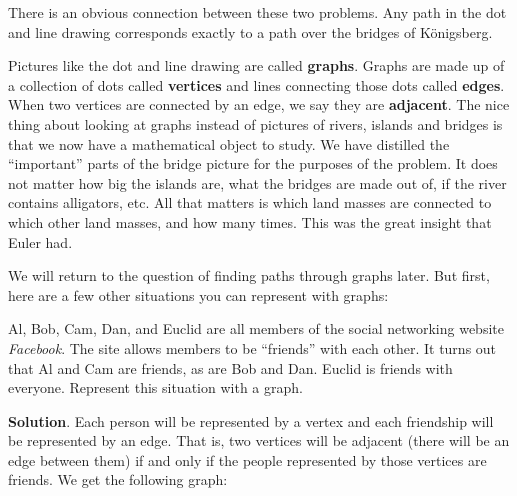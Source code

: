 \documentclass[11pt,]{book}
\newcommand{\terminology}[1]{\textbf{#1}}
\theoremstyle{ptxplainnotitle}
\theoremstyle{ptxplaintitle}
\theoremstyle{ptxdefinitionnotitle}
\theoremstyle{ptxdefinitiontitle}
\theoremstyle{ptxdefinitionnotitle}
\theoremstyle{ptxdefinitiontitle}
\theoremstyle{ptxdefinitionnotitle}
\theoremstyle{ptxdefinitiontitle}
\theoremstyle{ptxdefinitiontitlenonumber}
\theoremstyle{ptxdefinitiontitlenonumber}
\numberwithin{equation}{chapter}
\newcommand{\vtx}[2]{node[fill,circle,inner sep=0pt, minimum size=4pt,label=#1:#2]{}}
\newcommand{\vb}[1]{\vtx{below}{#1}}
\newcommand{\vr}[1]{\vtx{right}{#1}}
\newcommand{\vl}[1]{\vtx{left}{#1}}
\begin{document}
There is an obvious connection between these two problems. Any path in the dot and line drawing corresponds exactly to a path over the bridges of Königsberg.%
\par
\hypertarget{p-2541}{}%
Pictures like the dot and line drawing are called \terminology{graphs}. Graphs are made up of a collection of dots called \terminology{vertices} and lines connecting those dots called \terminology{edges}. When two vertices are connected by an edge, we say they are \terminology{adjacent}. The nice thing about looking at graphs instead of pictures of rivers, islands and bridges is that we now have a mathematical object to study. We have distilled the ``important'' parts of the bridge picture for the purposes of the problem. It does not matter how big the islands are, what the bridges are made out of, if the river contains alligators, etc. All that matters is which land masses are connected to which other land masses, and how many times. This was the great insight that Euler had.%
\par
\hypertarget{p-2542}{}%
We will return to the question of finding paths through graphs later. But first, here are a few other situations you can represent with graphs:%
\begin{example}\label{example-73}
\hypertarget{p-2543}{}%
Al, Bob, Cam, Dan, and Euclid are all members of the social networking website \emph{Facebook}. The site allows members to be ``friends'' with each other. It turns out that Al and Cam are friends, as are Bob and Dan. Euclid is friends with everyone. Represent this situation with a graph.%
\par\smallskip%
\noindent\textbf{Solution}.\hypertarget{solution-263}{}\quad%
\hypertarget{p-2544}{}%
Each person will be represented by a vertex and each friendship will be represented by an edge. That is, two vertices will be adjacent (there will be an edge between them) if and only if the people represented by those vertices are friends. We get the following graph:%
\begin{sidebyside}{1}{0.4}{0.4}{0}
\begin{sbspanel}{0.2}
\resizebox{\linewidth}{!}{{
        \begin{tikzpicture}[scale=0.7]
  \draw(-1, 0) \vl{C} -- (0,1) \vb{E} -- (-1,2) \vl{A} -- (-1,0)(1,0) \vr{D} -- (0,1)  -- (1,2) \vr{B} -- (1,0);
\end{tikzpicture}
}
}
\end{sbspanel}
\end{sidebyside}
\end{example}
\end{document}

